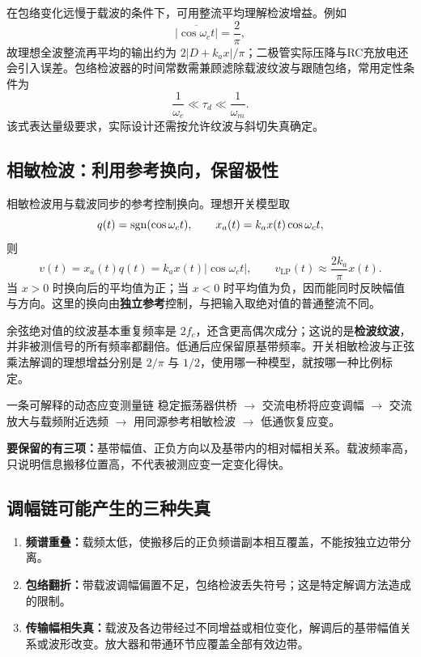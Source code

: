在包络变化远慢于载波的条件下，可用整流平均理解检波增益。例如
\[
\overline{|\cos\omega_ct|}=\frac2\pi,
\]
故理想全波整流再平均的输出约为 $2|D+k_ax|/\pi$；二极管实际压降与RC充放电还会引入误差。包络检波器的时间常数需兼顾滤除载波纹波与跟随包络，常用定性条件为
\[
\frac1{\omega_c}\ll\tau_d\ll\frac1{\omega_m}.
\]
该式表达量级要求，实际设计还需按允许纹波与斜切失真确定。

\subsection{相敏检波：利用参考换向，保留极性}

相敏检波用与载波同步的参考控制换向。理想开关模型取
\[
q(t)=\operatorname{sgn}(\cos\omega_ct),\qquad x_a(t)=k_ax(t)\cos\omega_ct,
\]
则
\[
v(t)=x_a(t)q(t)=k_ax(t)|\cos\omega_ct|,
\qquad
\boxed{v_{\mathrm{LP}}(t)\approx\frac{2k_a}{\pi}x(t)}.
\]
当 $x>0$ 时换向后的平均值为正；当 $x<0$ 时平均值为负，因而能同时反映幅值与方向。这里的换向由\textbf{独立参考}控制，与把输入取绝对值的普通整流不同。

余弦绝对值的纹波基本重复频率是 $2f_c$，还含更高偶次成分；这说的是\textbf{检波纹波}，并非被测信号的所有频率都翻倍。低通后应保留原基带频率。开关相敏检波与正弦乘法解调的理想增益分别是 $2/\pi$ 与 $1/2$，使用哪一种模型，就按哪一种比例标定。

\begin{focusbox}{一条可解释的动态应变测量链}
稳定振荡器供桥 $\longrightarrow$ 交流电桥将应变调幅 $\longrightarrow$ 交流放大与载频附近选频 $\longrightarrow$ 用同源参考相敏检波 $\longrightarrow$ 低通恢复应变。

\textbf{要保留的有三项：}基带幅值、正负方向以及基带内的相对幅相关系。载波频率高，只说明信息搬移位置高，不代表被测应变一定变化得快。
\end{focusbox}

\subsection{调幅链可能产生的三种失真}

\begin{enumerate}
\item \textbf{频谱重叠：}载频太低，使搬移后的正负频谱副本相互覆盖，不能按独立边带分离。
\item \textbf{包络翻折：}带载波调幅偏置不足，包络检波丢失符号；这是特定解调方法造成的限制。
\item \textbf{传输幅相失真：}载波及各边带经过不同增益或相位变化，解调后的基带幅值关系或波形改变。放大器和带通环节应覆盖全部有效边带。
\end{enumerate}

